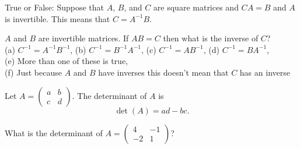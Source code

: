 %     
%  
%             
% 

\begin{problem}
    True or False: Suppose that $A$, $B$, and $C$ are square matrices and $CA = B$ and $A$
    is invertible.  This means that $C = A^{-1} B$.
\end{problem}

%             
% 

\begin{problem}
    $A$ and $B$ are invertible matrices.  If $AB = C$ then what is the inverse of $C$? \\
    (a) $C^{-1} = A^{-1} B^{-1}$, \quad 
    (b) $C^{-1} = B^{-1} A^{-1}$, \quad 
    (c) $C^{-1} = A B^{-1}$, \quad 
    (d) $C^{-1} = B A^{-1}$, \quad \\
    (e) More than one of these is true, \quad \\ (f) Just because $A$ and $B$ have inverses
    this doesn't mean that $C$ has an inverse
\end{problem}

%             


\begin{definition}
    Let $A = \begin{pmatrix} a & b \\ c & d \end{pmatrix}$.  The determinant of $A$ is 
    \[ \det(A) = ad - bc. \]
\end{definition}

\begin{problem}
    What is the determinant of $A = \begin{pmatrix} 4 & -1 \\ -2 & 1 \end{pmatrix}$?
\end{problem}
%

